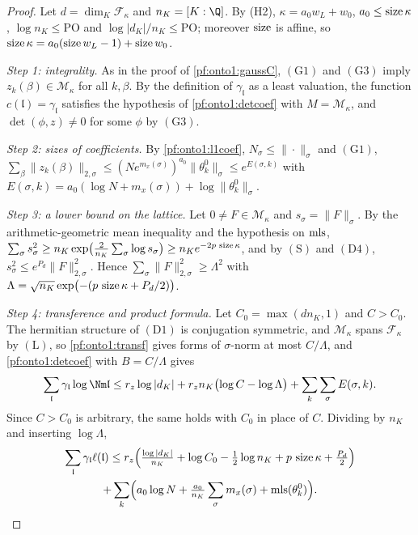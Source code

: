 \begin{proof}
Let $d=\dim_K\mathcal F_\kappa$ and $n_K=[K:\Q]$. By (H2), $\kappa=a_0w_L+w_0$, $a_0\le\operatorname{size}\kappa$, $\log n_K\le\mathrm{PO}$ and
$\log|d_K|/n_K\le\mathrm{PO}$; moreover $\operatorname{size}$ is affine, so $\operatorname{size}\kappa=a_0(\operatorname{size} w_L-1)+\operatorname{size} w_0$.

\emph{Step 1: integrality.} As in the proof of \cref{pf:onto1:gaussC}, $(\mathrm G1)$ and $(\mathrm G3)$ imply $z_k(\beta)\in\mathcal M_\kappa$
for all $k,\beta$. By the definition of $\gamma_{\mathfrak l}$ as a least valuation, the function $c(\mathfrak l)=\gamma_{\mathfrak l}$
satisfies the hypothesis of \cref{pf:onto1:detcoef} with $M=\mathcal M_\kappa$, and $\det(\phi,z)\ne0$ for some $\phi$ by $(\mathrm G3)$.

\emph{Step 2: sizes of coefficients.} By \cref{pf:onto1:l1coef}, $N_\sigma\le\|\cdot\|_\sigma$ and $(\mathrm G1)$,
$\sum_\beta\|z_k(\beta)\|_{2,\sigma}\le(Ne^{m_x(\sigma)})^{a_0}\|\theta^0_k\|_\sigma\le e^{E(\sigma,k)}$ with $E(\sigma,k)=a_0(\log N+m_x(\sigma))+\log
\|\theta^0_k\|_\sigma$.

\emph{Step 3: a lower bound on the lattice.} Let $0\ne F\in\mathcal M_\kappa$ and $s_\sigma=\|F\|_\sigma$. By the arithmetic-geometric
mean inequality and the hypothesis on $\operatorname{mls}$, $\sum_\sigma s_\sigma^2\ge n_K\exp\bigl(\tfrac2{n_K}\sum_\sigma\log s_\sigma\bigr)\ge
n_Ke^{-2p\,\operatorname{size}\kappa}$, and by $(\mathrm S)$ and $(\mathrm D4)$, $s_\sigma^2\le e^{P_d}\|F\|_{2,\sigma}^2$. Hence $\sum_\sigma\|F\|_{2,\sigma}^2\ge
\Lambda^2$ with $\Lambda=\sqrt{n_K}\exp\bigl(-(p\,\operatorname{size}\kappa+P_d/2)\bigr)$.

\emph{Step 4: transference and product formula.} Let $C_0=\max(dn_K,1)$ and $C>C_0$. The hermitian structure of $(\mathrm D1)$
is conjugation symmetric, and $\mathcal M_\kappa$ spans $\mathcal F_\kappa$ by $(\mathrm L)$, so \cref{pf:onto1:transf} gives forms of
$\sigma$-norm at most $C/\Lambda$, and \cref{pf:onto1:detcoef} with $B=C/\Lambda$ gives
\[
\sum_{\mathfrak l}\gamma_{\mathfrak l}\log\Nm\mathfrak l\le r_z\log|d_K|+r_zn_K\bigl(\log C-\log\Lambda\bigr)+\sum_k\sum_\sigma E(\sigma,k).
\]
Since $C>C_0$ is arbitrary, the same holds with $C_0$ in place of $C$. Dividing by $n_K$ and inserting $\log\Lambda$,
\begin{multline*}
\sum_{\mathfrak l}\gamma_{\mathfrak l}\ell(\mathfrak l)\le r_z\Bigl(\tfrac{\log|d_K|}{n_K}+\log C_0-\tfrac12\log n_K+p\,\operatorname{size}\kappa
+\tfrac{P_d}2\Bigr)\\+\sum_k\Bigl(a_0\log N+\tfrac{a_0}{n_K}\sum_\sigma m_x(\sigma)+\operatorname{mls}(\theta^0_k)\Bigr).
\end{multline*}


\end{proof}
